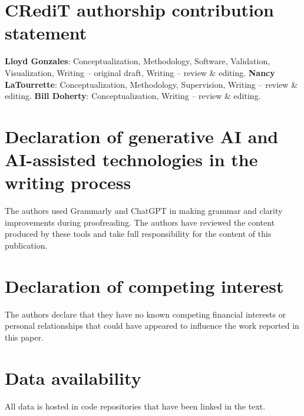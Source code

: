 \documentclass[preprint,12pt]{elsarticle}
\begin{document}
\section*{CRediT authorship contribution statement}

\textbf{Lloyd Gonzales}: Conceptualization, Methodology, Software, Validation, Visualization, Writing -- original draft, Writing -- review \& editing. 
\textbf{Nancy LaTourrette}: Conceptualization, Methodology, Supervision, Writing -- review \& editing. 
\textbf{Bill Doherty}: Conceptualization, Writing -- review \& editing.

\section*{Declaration of generative AI and AI-assisted technologies in the writing process}

The authors used Grammarly and ChatGPT in making grammar and clarity improvements
during proofreading. The authors have reviewed the content produced by these tools
and take full responsibility for the content of this publication.

\section*{Declaration of competing interest}

The authors declare that they have no known competing financial interests or
personal relationships that could have appeared to influence the work reported
in this paper.


\section*{Data availability}

All data is hosted in code repositories that have been linked in the text.

\appendix

%  

\end{document}
